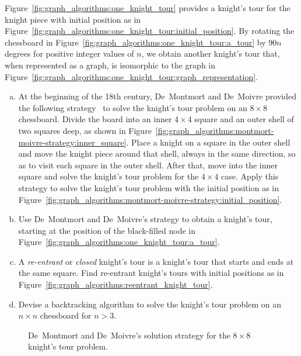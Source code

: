 \begin{problem}
\item Figure~\ref{fig:graph_algorithms:one_knight_tour} provides a
  knight's tour for the knight piece with initial position as in
  Figure~\ref{fig:graph_algorithms:one_knight_tour:initial_position}. By
  rotating the chessboard in
  Figure~\ref{fig:graph_algorithms:one_knight_tour:a_tour} by
  $90n$ degrees for positive integer values of $n$, we obtain another
  knight's tour that, when represented as a graph, is isomorphic to
  the graph in
  Figure~\ref{fig:graph_algorithms:one_knight_tour:graph_representation}.
  \begin{enumerate}[(a)]
  \item At the beginning of the 18th century, De~Montmort and
    De~Moivre provided the following
    strategy~\cite[p.176]{BallCoxeter1987} to solve the knight's tour
    problem on an $8 \times 8$ chessboard. Divide the board into an
    inner $4 \times 4$ square and an outer shell of two squares deep,
    as shown in
    Figure~\ref{fig:graph_algorithms:montmort-moivre-strategy:inner_square}.
    Place a knight on a square in the outer shell and move the knight
    piece around that shell, always in the same direction, so as to
    visit each square in the outer shell. After that, move into the
    inner square and solve the knight's tour problem for the
    $4 \times 4$ case. Apply this strategy to solve the knight's tour
    problem with the initial position as in
    Figure~\ref{fig:graph_algorithms:montmort-moivre-strategy:initial_position}.

  \item Use De~Montmort and De~Moivre's strategy to obtain a knight's
    tour, starting at the position of the black-filled node in
    Figure~\ref{fig:graph_algorithms:one_knight_tour:a_tour}.

  \item A \emph{re-entrant} or \emph{closed} knight's tour is a
    knight's tour that starts and ends at the same square. Find
    re-entrant knight's tours with initial positions as in
    Figure~\ref{fig:graph_algorithms:reentrant_knight_tour}.

  \item Devise a backtracking algorithm to solve the knight's tour
    problem on an $n \times n$ chessboard for $n > 3$.
  \end{enumerate}

\begin{figure}[!htbp]
\centering
{}

\caption{De~Montmort and De~Moivre's solution strategy for the
  $8 \times 8$ knight's tour problem.}
\label{fig:graph_algorithms:De_Montmort_De_Moivre_knight_tour_strategy}
\end{figure}


\end{problem}
